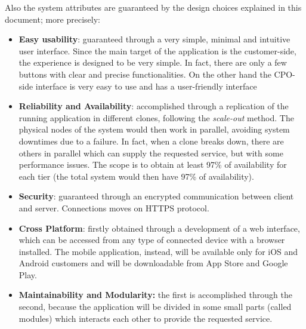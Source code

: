 Also the system attributes are guaranteed by the design choices explained in this document; more precisely:
\begin{itemize}
    \item \textbf{Easy usability}: guaranteed through a very simple, minimal and intuitive user interface. Since the main target of the application is the customer-side, the experience is designed to be very simple. In fact, there are only a few buttons with clear and precise functionalities.
    On the other hand the CPO-side interface is very easy to use and has a user-friendly interface
    \item \textbf{Reliability and Availability}: accomplished through a replication of the running application in different clones, following the \textit{scale-out} method. The physical nodes of the system would then work in parallel, avoiding system downtimes due to a failure. In fact, when a clone breaks down, there are others in parallel which can supply the requested service, but with some performance issues. The scope is to obtain at least 97\% of availability for each tier (the total system would then have 97\% of availability).
    \item \textbf{Security}: guaranteed through an encrypted communication between client and server. Connections moves on HTTPS protocol. 
    \item \textbf{Cross Platform}: firstly obtained through a development of a web interface, which can be accessed from any type of connected device with a browser installed. The mobile application, instead, will be available only for iOS and Android customers and will be downloadable from App Store and Google Play.
    \item \textbf{Maintainability and Modularity:} the first is accomplished through the second, because the application will be divided in some small parts (called modules) which interacts each other to provide the requested service.
\end{itemize}